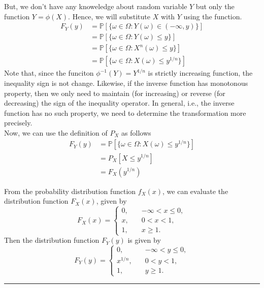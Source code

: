 \documentclass[twoside]{article}
\makeatletter
\theoremstyle{definition}
\theoremstyle{remark}
\theoremstyle{remark}
\newenvironment{example}
 {\patchcmd{\@thm}{\trivlist}{\list{}{\leftmargin=3em \rightmargin=3em}}{}{}%
  \vspace*{10\p@}
  \innerexample\pushQED{\hfill\ensuremath{\Diamond}}}
 {\popQED\endinnerexample}
\newenvironment{sol}{{\bf Solution:}}{\hfill\rule{2mm}{2mm}}
\makeatother
\begin{document}
\begin{example}
\begin{sol}
    But, we don't have any knoweledge about random variable $Y$ but only the
    function $Y = \phi(X)$. Hence, we will substitute $X$ with $Y$ using the
    function.
    \begin{equation*}
      \begin{split}
        F_Y(y)
        &= \mathbb{P}[{\{ \omega \in \Omega : Y(\omega)   \in  (-\infty, y) \}}] \\
        &= \mathbb{P}[{\{ \omega \in \Omega : Y(\omega)   \leq y \}}] \\
        &= \mathbb{P}[{\{ \omega \in \Omega : X^n(\omega) \leq y \}}] \\
        &= \mathbb{P}[{\{ \omega \in \Omega : X(\omega)   \leq y^{1/n} \}}]
      \end{split}
    \end{equation*}
    Note that, since the funciton $\phi^{-1}(Y) = Y^{1/n}$ is strictly increasing
    function, the inequality sign is not change. Likewise, if the inverse function
    has monotonous property, then we only need to maintain (for increasing) or
    reverse (for decreasing) the sign of the inequality operator. In general, i.e.,
    the inverse function has no such property, we need to determine the transformation
    more precisely.
    \\[0.5\baselineskip]
    Now, we can use the definition of $P_X$ as follows
    \begin{equation*}
      \begin{split}
        F_Y(y)
        &= \mathbb{P}[{\{ \omega \in \Omega : X(\omega)   \leq y^{1/n} \}}] \\
        &= P_X[X \leq y^{1/n}] \\
        &= F_X(y^{1/n})
      \end{split}
    \end{equation*}

    From the probability distribution function $f_X(x)$, we can evaluate the distribution
    function $F_X(x)$, given by
    \begin{equation*}
      F_X(x) =
      \left\{
      \begin{array}{lr}
        0, \quad & -\infty < x \leq 0, \\
        x, \quad & 0 < x < 1, \\
        1, \quad & x \geq 1.
      \end{array}
      \right.
    \end{equation*}
    Then the distribution function $F_Y(y)$ is given by
    \begin{equation*}
      F_Y(y) =
      \left\{
      \begin{array}{lr}
        0,        \quad & -\infty < y \leq 0, \\
        x^{1/n},  \quad & 0 < y < 1, \\
        1,        \quad & y \geq 1.
      \end{array}
      \right.
    \end{equation*}
  \end{sol}
  
\end{example}
\end{document}
